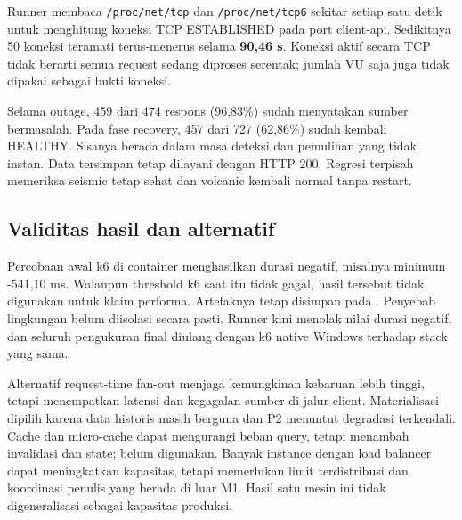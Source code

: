 
Runner membaca \nolinkurl{/proc/net/tcp} dan \nolinkurl{/proc/net/tcp6} sekitar setiap satu detik untuk menghitung koneksi TCP ESTABLISHED pada port client-api. Sedikitnya 50 koneksi teramati terus-menerus selama \textbf{90,46 s}. Koneksi aktif secara TCP tidak berarti semua request sedang diproses serentak; jumlah VU saja juga tidak dipakai sebagai bukti koneksi.

Selama outage, 459 dari 474 respons (96,83\%) sudah menyatakan sumber bermasalah. Pada fase recovery, 457 dari 727 (62,86\%) sudah kembali HEALTHY. Sisanya berada dalam masa deteksi dan pemulihan yang tidak instan. Data tersimpan tetap dilayani dengan HTTP 200. Regresi terpisah memeriksa seismic tetap sehat dan volcanic kembali normal tanpa restart.

\subsection{Validitas hasil dan alternatif}
Percobaan awal k6 di container menghasilkan durasi negatif, misalnya minimum -541,10 ms. Walaupun threshold k6 saat itu tidak gagal, hasil tersebut tidak digunakan untuk klaim performa. Artefaknya tetap disimpan pada . Penyebab lingkungan belum diisolasi secara pasti. Runner kini menolak nilai durasi negatif, dan seluruh pengukuran final diulang dengan k6 native Windows terhadap stack yang sama.

Alternatif request-time fan-out menjaga kemungkinan kebaruan lebih tinggi, tetapi menempatkan latensi dan kegagalan sumber di jalur client. Materialisasi dipilih karena data historis masih berguna dan P2 menuntut degradasi terkendali. Cache dan micro-cache dapat mengurangi beban query, tetapi menambah invalidasi dan state; belum digunakan. Banyak instance dengan load balancer dapat meningkatkan kapasitas, tetapi memerlukan limit terdistribusi dan koordinasi penulis yang berada di luar M1. Hasil satu mesin ini tidak digeneralisasi sebagai kapasitas produksi.
